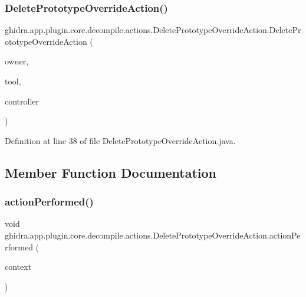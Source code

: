 \subsubsection{\texorpdfstring{DeletePrototypeOverrideAction()}{DeletePrototypeOverrideAction()}}
{\footnotesize\ttfamily ghidra.\+app.\+plugin.\+core.\+decompile.\+actions.\+Delete\+Prototype\+Override\+Action.\+Delete\+Prototype\+Override\+Action (\begin{DoxyParamCaption}\item[{String}]{owner,  }\item[{Plugin\+Tool}]{tool,  }\item[{\mbox{\hyperlink{classghidra_1_1app_1_1decompiler_1_1component_1_1_decompiler_controller}{Decompiler\+Controller}}}]{controller }\end{DoxyParamCaption})\hspace{0.3cm}{\ttfamily [inline]}}



Definition at line 38 of file Delete\+Prototype\+Override\+Action.\+java.



\subsection{Member Function Documentation}
\mbox{\label{classghidra_1_1app_1_1plugin_1_1core_1_1decompile_1_1actions_1_1_delete_prototype_override_action_a387e73291be3b42001b158151b4539a2}} 
\subsubsection{\texorpdfstring{actionPerformed()}{actionPerformed()}}
{\footnotesize\ttfamily void ghidra.\+app.\+plugin.\+core.\+decompile.\+actions.\+Delete\+Prototype\+Override\+Action.\+action\+Performed (\begin{DoxyParamCaption}\item[{Action\+Context}]{context }\end{DoxyParamCaption})\hspace{0.3cm}{\ttfamily [inline]}}



